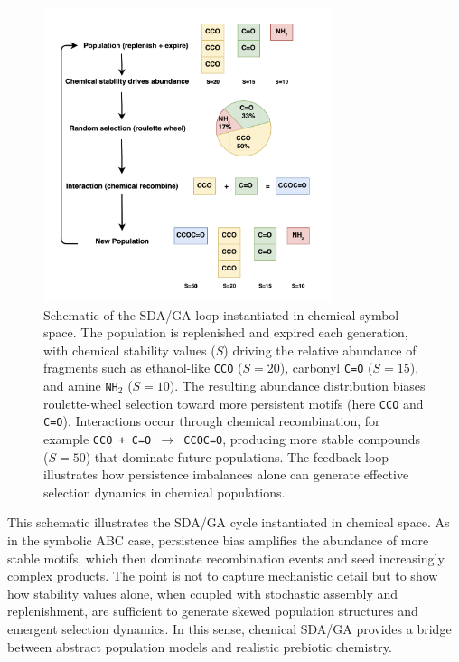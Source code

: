 \documentclass[life,article,submit,pdftex,moreauthors]{Definitions/mdpi}
\begin{document}
\begin{figure}[H]
    \centering
    \includegraphics[width=0.75\textwidth]{SDA-Chem.png}
    \caption{Schematic of the SDA/GA loop instantiated in chemical symbol space. 
    The population is replenished and expired each generation, with chemical 
    stability values ($S$) driving the relative abundance of fragments such as 
    ethanol-like \texttt{CCO} ($S=20$), carbonyl \texttt{C=O} ($S=15$), and amine 
    \texttt{NH$_2$} ($S=10$). The resulting abundance distribution biases 
    roulette-wheel selection toward more persistent motifs (here \texttt{CCO} 
    and \texttt{C=O}). Interactions occur through chemical recombination, for 
    example \texttt{CCO + C=O $\to$ CCOC=O}, producing more stable compounds 
    ($S=50$) that dominate future populations. The feedback loop illustrates how 
    persistence imbalances alone can generate effective selection dynamics in 
    chemical populations.}
    \label{fig:sda-chem-loop}
\end{figure}

This schematic illustrates the SDA/GA cycle instantiated in chemical space. As in the symbolic ABC case, persistence bias amplifies the abundance of more stable motifs, which then dominate recombination events and seed increasingly complex products. The point is not to capture mechanistic detail but to show how stability values alone, when coupled with stochastic assembly and replenishment, are sufficient to generate skewed population structures and emergent selection dynamics. In this sense, chemical SDA/GA provides a bridge between abstract population models and realistic prebiotic chemistry.
\end{document}
